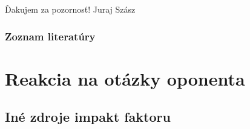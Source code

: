 \documentclass{beamer}
\begin{document}

\appendix

%
%
\begin{frame}
  \begin{center}
    \Huge Ďakujem za pozornosť!
    \vfill
    \Large Juraj Szász
  \end{center}
\end{frame}

%
%
\begin{frame}[t, allowframebreaks]
  \frametitle{Zoznam literatúry}
  {}
\end{frame}

%
%
\section{Reakcia na otázky oponenta}

\subsection{Iné zdroje impakt faktoru}
\end{document}
